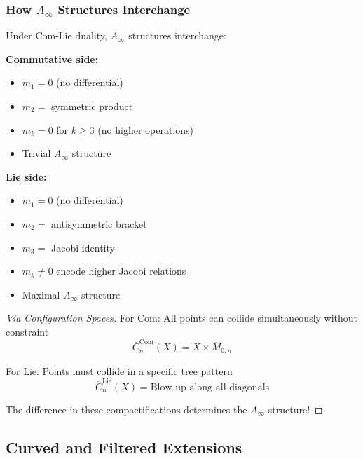 \subsubsection{How $A_\infty$ Structures Interchange}

\begin{theorem}
Under Com-Lie duality, $A_\infty$ structures interchange:

\textbf{Commutative side:}
\begin{itemize}
\item $m_1 = 0$ (no differential)
\item $m_2 = $ symmetric product
\item $m_k = 0$ for $k \geq 3$ (no higher operations)
\item Trivial $A_\infty$ structure
\end{itemize}

\textbf{Lie side:}
\begin{itemize}
\item $m_1 = 0$ (no differential)
\item $m_2 = $ antisymmetric bracket
\item $m_3 = $ Jacobi identity
\item $m_k \neq 0$ encode higher Jacobi relations
\item Maximal $A_\infty$ structure
\end{itemize}
\end{theorem}

\begin{proof}[Via Configuration Spaces]
For Com: All points can collide simultaneously without constraint
$$\overline{C}_n^{\text{Com}}(X) = X \times \overline{M}_{0,n}$$

For Lie: Points must collide in a specific tree pattern
$$\overline{C}_n^{\text{Lie}}(X) = \text{Blow-up along all diagonals}$$

The difference in these compactifications determines the $A_\infty$ structure!
\end{proof}


\subsection{Curved and Filtered Extensions}

